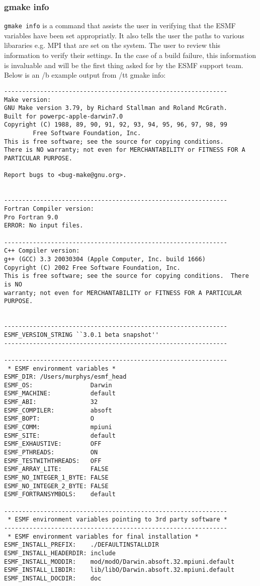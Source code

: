 \subsubsection{gmake info}
{\tt gmake info} is a command that assists the user in verifying that the ESMF 
variables have been set appropriatly.
It also tells the user the paths to various libararies e.g. MPI that are set on the system.  The user to review this
information to verify their settings. In the case of a build failure, this information is invaluable and will be the
first thing asked for by the ESMF support team. Below is an {/b example output} from {/tt gmake info}:  
\begin{verbatim}
--------------------------------------------------------------
Make version:
GNU Make version 3.79, by Richard Stallman and Roland McGrath.
Built for powerpc-apple-darwin7.0
Copyright (C) 1988, 89, 90, 91, 92, 93, 94, 95, 96, 97, 98, 99
        Free Software Foundation, Inc.
This is free software; see the source for copying conditions.
There is NO warranty; not even for MERCHANTABILITY or FITNESS FOR A
PARTICULAR PURPOSE.

Report bugs to <bug-make@gnu.org>.


--------------------------------------------------------------
Fortran Compiler version:
Pro Fortran 9.0
ERROR: No input files.

--------------------------------------------------------------
C++ Compiler version:
g++ (GCC) 3.3 20030304 (Apple Computer, Inc. build 1666)
Copyright (C) 2002 Free Software Foundation, Inc.
This is free software; see the source for copying conditions.  There is NO
warranty; not even for MERCHANTABILITY or FITNESS FOR A PARTICULAR PURPOSE.


--------------------------------------------------------------
ESMF_VERSION_STRING ``3.0.1 beta snapshot''
--------------------------------------------------------------

--------------------------------------------------------------
 * ESMF environment variables *
ESMF_DIR: /Users/murphys/esmf_head
ESMF_OS:                Darwin
ESMF_MACHINE:           default
ESMF_ABI:               32
ESMF_COMPILER:          absoft
ESMF_BOPT:              O
ESMF_COMM:              mpiuni
ESMF_SITE:              default
ESMF_EXHAUSTIVE:        OFF
ESMF_PTHREADS:          ON
ESMF_TESTWITHTHREADS:   OFF
ESMF_ARRAY_LITE:        FALSE
ESMF_NO_INTEGER_1_BYTE: FALSE
ESMF_NO_INTEGER_2_BYTE: FALSE
ESMF_FORTRANSYMBOLS:    default

--------------------------------------------------------------
 * ESMF environment variables pointing to 3rd party software *
--------------------------------------------------------------
 * ESMF environment variables for final installation *
ESMF_INSTALL_PREFIX:    ./DEFAULTINSTALLDIR
ESMF_INSTALL_HEADERDIR: include
ESMF_INSTALL_MODDIR:    mod/modO/Darwin.absoft.32.mpiuni.default
ESMF_INSTALL_LIBDIR:    lib/libO/Darwin.absoft.32.mpiuni.default
ESMF_INSTALL_DOCDIR:    doc



\end{verbatim}
